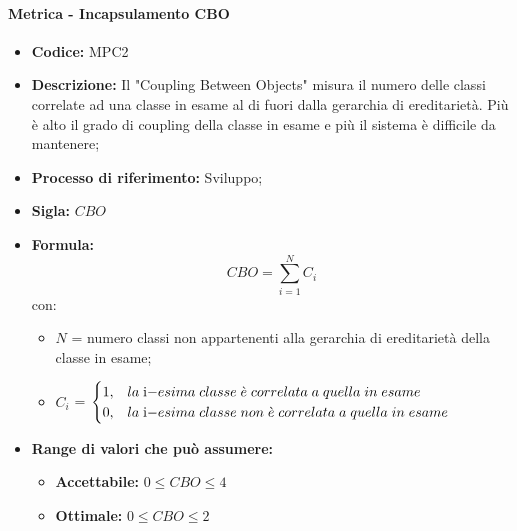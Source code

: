     \paragraph{Metrica - Incapsulamento CBO}
    \begin{itemize}
        \item \textbf{Codice:} MPC2
        \item \textbf{Descrizione:} Il "Coupling Between Objects" misura il numero delle classi correlate ad una classe in esame al di fuori dalla gerarchia di ereditarietà. Più è alto il grado di coupling della classe in esame e più il sistema è difficile da mantenere;
        \item \textbf{Processo di riferimento:} Sviluppo;
        \item \textbf{Sigla:} $CBO$
        \item \textbf{Formula:} $$CBO = {\sum_{i=1}^{N} C_i}$$
        con:
        \begin{itemize}
            \item $N$ = numero classi non appartenenti alla gerarchia di ereditarietà della classe in esame;
            \item $C_i$ =
            \begin{math} {
                \begin{cases}
                    1, & la \; $i$-esima \; classe \; \grave{e} \; correlata \; a \; quella \; in \; esame \\
                    0, & la \; $i$-esima \; classe \; non \; \grave{e} \; correlata \; a \; quella \; in \; esame
                \end{cases}
            }
            \end{math}
        \end{itemize}
        \item \textbf{Range di valori che può assumere:}
        \begin{itemize}
            \item \textbf{Accettabile:} $0 \leq{} CBO \leq 4$
            \item \textbf{Ottimale:} $0 \leq{} CBO \leq 2$
        \end{itemize}
    \end{itemize}

